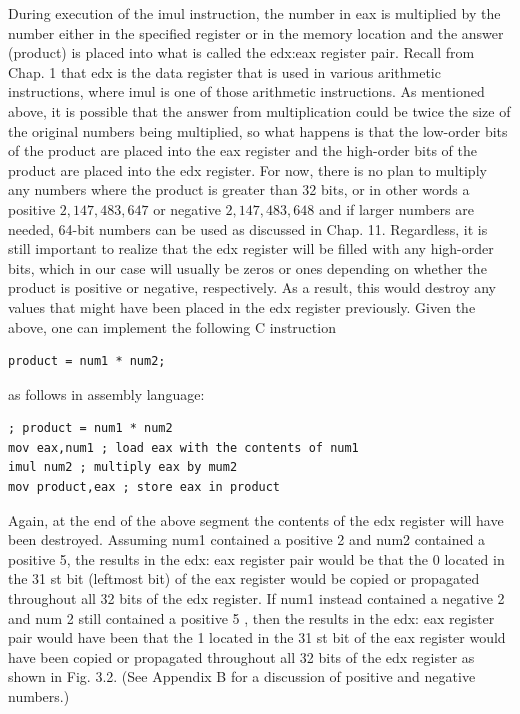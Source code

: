 \documentclass[10pt]{book}
\begin{document}
During execution of the imul instruction, the number in eax is multiplied by the number either in the specified register or in the memory location and the answer (product) is placed into what is called the edx:eax register pair. Recall from Chap. 1 that edx is the data register that is used in various arithmetic instructions, where imul is one of those arithmetic instructions. As mentioned above, it is possible that the answer from multiplication could be twice the size of the original numbers being multiplied, so what happens is that the low-order bits of the product are placed into the eax register and the high-order bits of the product are placed into the edx register. For now, there is no plan to multiply any numbers where the product is greater than 32 bits, or in other words a positive $2,147,483,647$ or negative $2,147,483,648$ and if larger numbers are needed, 64-bit numbers can be used as discussed in Chap. 11. Regardless, it is still important to realize that the edx register will be filled with any high-order bits, which in our case will usually be zeros or ones depending on whether the product is positive or negative, respectively. As a result, this would destroy any values that might have been placed in the edx register previously. Given the above, one can implement the following C instruction
\begin{verbatim}
product = num1 * num2;
\end{verbatim}

as follows in assembly language:

\begin{verbatim}
; product = num1 * num2
mov eax,num1 ; load eax with the contents of num1
imul num2 ; multiply eax by mum2
mov product,eax ; store eax in product
\end{verbatim}

Again, at the end of the above segment the contents of the edx register will have been destroyed. Assuming num1 contained a positive 2 and num2 contained a positive 5, the results in the edx: eax register pair would be that the 0 located in the 31 st bit (leftmost bit) of the eax register would be copied or propagated throughout all 32 bits of the edx register. If num1 instead contained a negative 2 and num 2 still contained a positive 5 , then the results in the edx: eax register pair would have been that the 1 located in the 31 st bit of the eax register would have been copied or propagated throughout all 32 bits of the edx register as shown in Fig. 3.2. (See Appendix B for a discussion of positive and negative numbers.)
\end{document}
